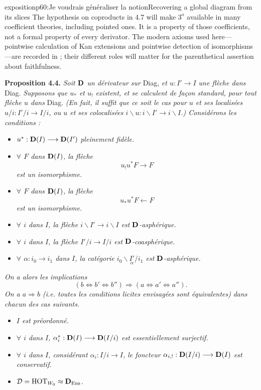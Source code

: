 \begin{dcomment}{exposition}{p60:Je voudrais généraliser la notion}{Recovering a global diagram from its slices}
The hypothesis on coproducts in 4.7 will make $3^o$ available in many coefficient theories, including pointed ones. It is a property of those coefficients, not a formal property of every derivator. The modern axioms used here---pointwise calculation of Kan extensions and pointwise detection of isomorphisms---are recorded in \citet[Definition 1.5]{Groth2013}; their different roles will matter for the parenthetical assertion about faithfulness.
\end{dcomment}


\textbf{Proposition 4.4.} \textit{Soit $\mathbf{D}$ un dérivateur sur} Diag, \textit{et $u : I' \longrightarrow I$ une flèche dans} Diag. \textit{Supposons que $u_*$ et $u_!$ existent, et se calculent de façon standard, pour tout flèche $u$ dans} Diag. \textit{(En fait, il suffit que ce soit le cas pour $u$ et ses localisées $u/i : I'/i \longrightarrow I/i$, ou $u$ et ses colocalisées $i\backslash u : i\backslash I' \longrightarrow i\backslash I$.) Considérons les conditions :} %
\begin{itemize}[leftmargin=4em]
\item[\textit{a)}] $u^* : \mathbf{D}(I) \longrightarrow \mathbf{D}(I')$ \textit{pleinement fidèle.}
\item[\textit{a$'$)}] \textit{$\forall$ $F$ dans $\mathbf{D}(I)$, la flèche}
\[
u_!u^*F \longrightarrow F
\]
\textit{est un isomorphisme.}
\item[\textit{a$''$)}] \textit{$\forall$ $F$ dans $\mathbf{D}(I)$, la flèche}
\[
u_*u^*F \longleftarrow F
\]
\textit{est un isomorphisme.}
\item[\textit{b)}] \textit{$\forall$ $i$ dans $I$, la flèche $i\backslash I' \longrightarrow i\backslash I$ est $\mathbf{D}$-asphérique.}
\item[\textit{b$'$)}] \textit{$\forall$ $i$ dans $I$, la flèche $I'/i \longrightarrow I/i$ est $\mathbf{D}$-coasphérique.}
\item[\textit{b$''$)}] \textit{$\forall$ $\alpha : i_0 \longrightarrow i_1$ dans $I$, la catégorie $i_0\backslash\underset{\alpha}{I'}/i_1$ est $\mathbf{D}$-asphérique.}
\end{itemize}
\textit{On a alors les implications}
\[
(b \Longleftrightarrow b' \Longleftrightarrow b'') \Longrightarrow (a \Longleftrightarrow a' \Longleftrightarrow a'').
\]
\textit{On a $a \Longrightarrow b$ (i.e. toutes les conditions licites envisagées sont équivalentes)} \textit{dans chacun des cas suivants.}
\begin{itemize}[leftmargin=4em]
\item[$1^o$] \textit{$I$ est préordonné.}
\item[$2^o$] \textit{$\forall$ $i$ dans $I$, $\alpha_i^* : \mathbf{D}(I) \longrightarrow \mathbf{D}(I/i)$ est essentiellement surjectif.}
\item[$3^o$] \textit{$\forall$ $i$ dans $I$, considérant $\alpha_i : I/i \longrightarrow I$, le foncteur $\alpha_{i,!} : \mathbf{D}(I/i) \longrightarrow \mathbf{D}(I)$ est conservatif.}
\item[$4^o$] $\mathcal{D} = \mathrm{HOT}_{W_0} \approx \mathbf{D}_{\mathrm{Ens}}$.
\end{itemize}
